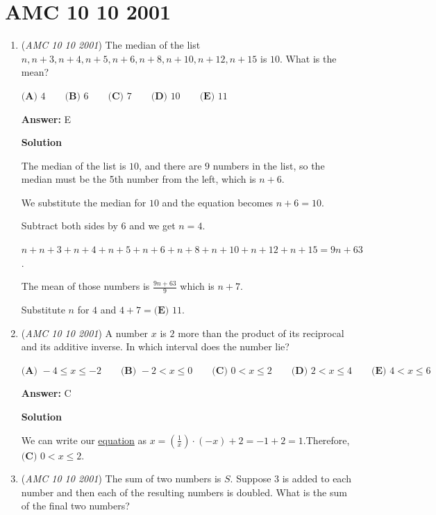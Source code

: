 \section{AMC 10 10 2001}
        \begin{enumerate}
        	\item (\textit{AMC 10 10 2001}) The median of the list $n, n + 3, n + 4, n + 5, n + 6, n + 8, n + 10, n + 12, n + 15$
is $10$. What is the mean?


 $\textbf{(A) } 4 \qquad\textbf{(B) } 6 \qquad\textbf{(C) } 7 \qquad\textbf{(D) } 10 \qquad\textbf{(E) } 11$

 \textbf{Answer: }E



\textbf{Solution}

The median of the list is $10$, and there are $9$ numbers in the list, so the median must be the 5th number from the left, which is $n+6$.

 We substitute the median for $10$ and the equation becomes $n+6=10$.

 Subtract both sides by 6 and we get $n=4$.

 $n+n+3+n+4+n+5+n+6+n+8+n+10+n+12+n+15=9n+63$.

 The mean of those numbers is $\frac{9n+63}{9}$ which is $n+7$. 

 Substitute $n$ for $4$ and $4+7=\boxed{\textbf{(E) }11}$.

 


	\item (\textit{AMC 10 10 2001}) A number $x$ is $2$ more than the product of its reciprocal and its additive inverse. In which interval does the number lie?


 $\textbf{(A) }  -4\leq x\leq -2 \qquad\textbf{(B) } -2<x\leq 0 \qquad\textbf{(C) } 0<x\leq 2 \qquad\textbf{(D) } 2<x\leq 4 \qquad\textbf{(E) } 4<x\leq 6$

 \textbf{Answer: }C



\textbf{Solution}

We can write our \href{https://artofproblemsolving.com/wiki/index.php?title=Equation}{equation} as $x= \left(\frac{1}{x} \right) \cdot (-x) +2 = -1+2 = 1$.Therefore, $\boxed{\textbf{(C) }0 < x\le 2}$.

 


	\item (\textit{AMC 10 10 2001}) The sum of two numbers is $S$. Suppose $3$ is added to each number and then each of the resulting numbers is doubled. What is the sum of the final two numbers?



\end{enumerate}
